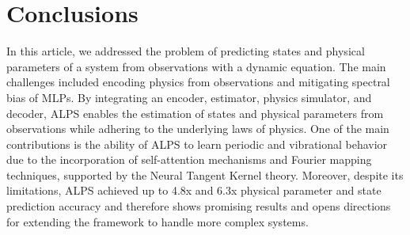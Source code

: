 \documentclass[acmtog]{techreportacmart}
\begin{document}
\section{Conclusions}
In this article, we addressed the problem of predicting states and physical parameters of a system from observations with a dynamic equation. The main challenges included encoding physics from observations and mitigating spectral bias of MLPs. By integrating an encoder, estimator, physics simulator, and decoder, ALPS enables the estimation of states and physical parameters from observations while adhering to the underlying laws of physics. One of the main contributions is the ability of ALPS to learn periodic and vibrational behavior due to the incorporation of self-attention mechanisms and Fourier mapping techniques, supported by the Neural Tangent Kernel theory. Moreover, despite its limitations, ALPS achieved up to 4.8x and 6.3x physical parameter and state prediction accuracy and therefore shows promising results and opens directions for extending the framework to handle more complex systems.



\end{document}
